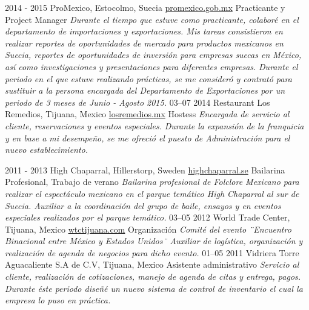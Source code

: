 \documentclass[]{friggeri-cv}
\begin{document}
\begin{entrylist}
  \bigentry
    {2014 - 2015}
    {ProMexico, Estocolmo, Suecia \newline 
        {\href{http://www.promexico.gob.mx/en/mx/stockholm}{promexico.gob.mx}}}
    {Practicante y Project Manager}
    {\emph{Durante el tiempo que estuve como practicante, colaboré en el departamento de importaciones y exportaciones. Mis tareas consistieron en realizar reportes de oportunidades de mercado para productos mexicanos en Suecia, reportes de oportunidades de inversión para empresas suecas en México, así como investigaciones y presentaciones para diferentes empresas.}}
    {\textit{ Durante el periodo en el que estuve realizando prácticas, se me consideró y contrató para sustituir a la persona encargada del Departamento de Exportaciones por un periodo de 3 meses de Junio - Agosto 2015.}}
  \bigentry
    {03–07 2014}
    {Restaurant Los Remedios, Tijuana, Mexico \newline
        {\href{http://www.losremedios.mx/}{losremedios.mx}}}
    {Hostess}
    {\emph{Encargada de servicio al cliente, reservaciones y eventos especiales.}}
    {\textit{ Durante la expansión de la franquicia y en base a mi desempeño, se me ofreció el puesto de Administración para el nuevo establecimiento.}}

  \entry
    {2011 - 2013}
    {High Chaparral, Hillerstorp, Sweden \newline
        {\href{http://www.highchaparral.se/sv/}{highchaparral.se}}}
    {Bailarina Profesional, Trabajo de verano}
    {\emph{Bailarina profesional de Folclore Mexicano para realizar el espectáculo mexicano en el parque temático High Chaparral al sur de Suecia. 
    Auxiliar a la coordinación del grupo de baile, ensayos y en eventos especiales realizados por el parque temático.}}
  \entry
    {03–05 2012}
    {World Trade Center, Tijuana, Mexico \newline
        {\href{http://www.wtctijuana.com/}{wtctijuana.com}}
    }
    {Organización}
    {\emph{Comité del evento ¨Encuentro Binacional entre México y Estados Unidos¨
    Auxiliar de logística, organización y realización de agenda de negocios para dicho evento.}}
  \bigentry
    {01–05 2011}
    {Vidriera Torre Aguacaliente S.A de C.V, Tijuana, Mexico}
    {Asistente administrativo}
    {\emph{Servicio al cliente, realización de cotizaciones, manejo de agenda de citas y entrega, pagos.}}
    {\textit{ Durante éste periodo diseñé un nuevo sistema de control de inventario el cual la empresa lo puso en práctica.}}
\end{entrylist}
\end{document}
